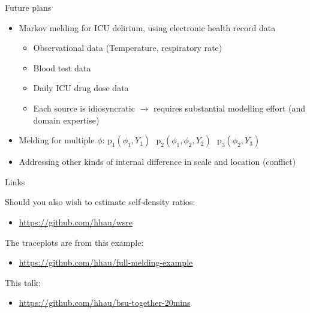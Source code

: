 \documentclass[10pt,ignorenonframetext,]{beamer}
\providecommand{\tightlist}{%
  \setlength{\itemsep}{0pt}\setlength{\parskip}{0pt}}
\newcommand{\pd}{\text{p}}
\begin{document}
\begin{frame}{Future plans}

\begin{itemize}
\tightlist
\item
  Markov melding for ICU delirium, using electronic health record data

  \begin{itemize}
  \tightlist
  \item
    Observational data (Temperature, respiratory rate)
  \item
    Blood test data
  \item
    Daily ICU drug dose data
  \item
    Each source is idiosyncratic \(\rightarrow\) requires substantial
    modelling effort (and domain expertise)
  \end{itemize}
\item
  Melding for multiple \(\phi\):
  \(\pd_{1}(\phi_{1}, Y_{1}) \,\,\,\, \pd_{2}(\phi_{1}, \phi_{2}, Y_{2}) \,\,\,\, \pd_{3}(\phi_{2}, Y_{3})\)
\item
  Addressing other kinds of internal difference in scale and location
  (conflict)
\end{itemize}

\end{frame}

\begin{frame}{Links}

Should you also wish to estimate self-density ratios:

\begin{itemize}
\tightlist
\item
  \url{https://github.com/hhau/wsre}
\end{itemize}

The traceplots are from this example:

\begin{itemize}
\tightlist
\item
  \url{https://github.com/hhau/full-melding-example}
\end{itemize}

This talk:

\begin{itemize}
\tightlist
\item
  \url{https://github.com/hhau/bsu-together-20mins}
\end{itemize}

\end{frame}
\end{document}
